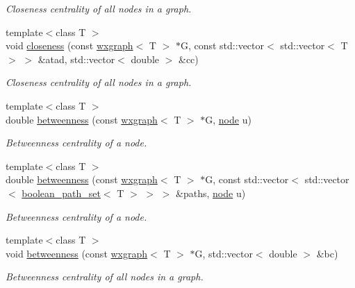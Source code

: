 \begin{DoxyCompactItemize}
\begin{DoxyCompactList}\small\item\em Closeness centrality of all nodes in a graph. \end{DoxyCompactList}\item 
{\footnotesize template$<$class T $>$ }\\void \hyperlink{namespacelgraph_1_1networks_1_1metrics_1_1centralities_a05e8a2bf5c57440c5a1aced933ea13bf}{closeness} (const \hyperlink{classlgraph_1_1wxgraph}{wxgraph}$<$ T $>$ $\ast$G, const std\+::vector$<$ std\+::vector$<$ T $>$ $>$ \&atad, std\+::vector$<$ double $>$ \&cc)
\begin{DoxyCompactList}\small\item\em Closeness centrality of all nodes in a graph. \end{DoxyCompactList}\item 
{\footnotesize template$<$class T $>$ }\\double \hyperlink{namespacelgraph_1_1networks_1_1metrics_1_1centralities_a5a8a94d9361a49ffa657d8d6541be4be}{betweenness} (const \hyperlink{classlgraph_1_1wxgraph}{wxgraph}$<$ T $>$ $\ast$G, \hyperlink{namespacelgraph_a397169dd66adf725210a30fb7251773e}{node} u)
\begin{DoxyCompactList}\small\item\em Betweenness centrality of a node. \end{DoxyCompactList}\item 
{\footnotesize template$<$class T $>$ }\\double \hyperlink{namespacelgraph_1_1networks_1_1metrics_1_1centralities_a22d289500772bb1c1c40f705f8cfcdf0}{betweenness} (const \hyperlink{classlgraph_1_1wxgraph}{wxgraph}$<$ T $>$ $\ast$G, const std\+::vector$<$ std\+::vector$<$ \hyperlink{namespacelgraph_afad432931ba600ab1628d5c9595986c5}{boolean\+\_\+path\+\_\+set}$<$ T $>$ $>$ $>$ \&paths, \hyperlink{namespacelgraph_a397169dd66adf725210a30fb7251773e}{node} u)
\begin{DoxyCompactList}\small\item\em Betweenness centrality of a node. \end{DoxyCompactList}\item 
{\footnotesize template$<$class T $>$ }\\void \hyperlink{namespacelgraph_1_1networks_1_1metrics_1_1centralities_adbfe6a6a80259a6c75c63ca60813b0f8}{betweenness} (const \hyperlink{classlgraph_1_1wxgraph}{wxgraph}$<$ T $>$ $\ast$G, std\+::vector$<$ double $>$ \&bc)
\begin{DoxyCompactList}\small\item\em Betweenness centrality of all nodes in a graph. \end{DoxyCompactList}\item 

\end{DoxyCompactItemize}
